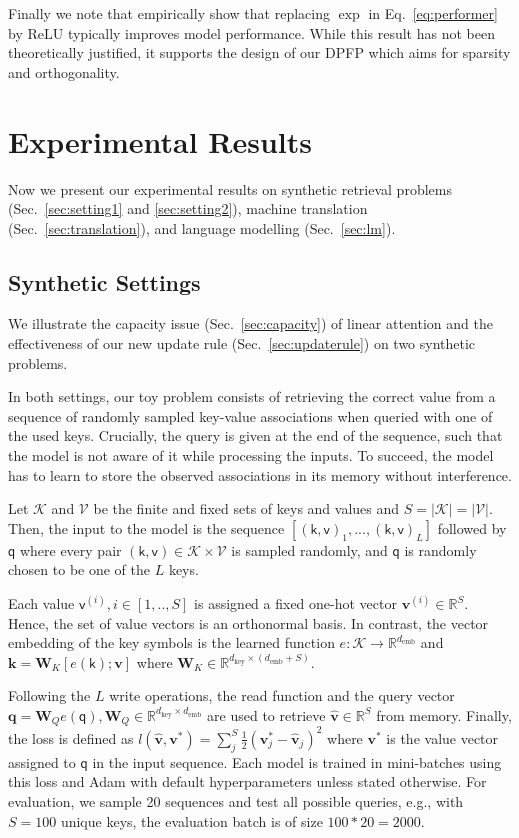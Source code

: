 \documentclass{article}
\def\vk{{\bm{k}}}
\def\vq{{\bm{q}}}
\def\vv{{\bm{v}}}
\def\mW{{\bm{W}}}
\newcommand{\ReLU}{\mathrm{ReLU}}
\theoremstyle{definition}
\begin{document}
Finally we note that \citet{choromanski2020rethinking} empirically show that replacing $\exp$
in Eq.~\ref{eq:performer} by $\ReLU$ typically improves model performance.
While this result has not been theoretically justified, it supports the
design of our DPFP which aims for sparsity and orthogonality.

\section{Experimental Results}
Now we present our experimental results on
synthetic retrieval problems (Sec.~\ref{sec:setting1} and \ref{sec:setting2}),
 machine translation (Sec.~\ref{sec:translation}), and language modelling (Sec.~\ref{sec:lm}).
\subsection{Synthetic Settings}
\label{sec:synthetic}
We illustrate the capacity issue (Sec.~\ref{sec:capacity}) of 
linear attention and the effectiveness of our new update rule (Sec.~\ref{sec:updaterule}) on two synthetic problems.

In both settings, our toy problem consists of retrieving the correct value from a sequence of randomly sampled key-value associations when queried with one of the used keys.
Crucially, the query is given at the end of the sequence, such that the model is not aware of it
while processing the inputs.
To succeed, the model has to learn to store the observed associations in its memory without interference. 

Let $\mathcal{K}$ and $\mathcal{V}$ be the finite and fixed sets of keys and values and $S=|\mathcal{K}|=|\mathcal{V}|$. 
Then, the input to the model is the sequence 
$[(\mathsf{k},\mathsf{v})_1, ..., (\mathsf{k},\mathsf{v})_L]$ 
followed by $\mathsf{q}$ 
where every pair $(\mathsf{k},\mathsf{v}) \in \mathcal{K} \times \mathcal{V}$ is sampled randomly,
and $\mathsf{q}$ is randomly chosen to be one of the $L$ keys.

Each value $\mathsf{v}^{(i)}, i \in [1,..,S]$ is assigned a fixed one-hot vector $\vv^{(i)} \in \mathbb{R}^S$. Hence, the set of value vectors is an orthonormal basis.
In contrast, the vector embedding of the key symbols is the learned function $e: \mathcal{K} \rightarrow \mathbb{R}^{d_\text{emb}}$
and $\vk = \mW_K [e(\mathsf{k});\vv]$ 
where $\mW_K \in \mathbb{R}^{d_\text{key} \times (d_\text{emb} + S)}$.

Following the $L$ write operations, the read function and the query vector 
$\vq = \mW_Q e(\mathsf{q}), \mW_Q \in \mathbb{R}^{d_\text{key} \times d_\text{emb}}$ 
are used to retrieve $\hat{\vv} \in \mathbb{R}^S$ from memory.
Finally, the loss is defined as 
$l(\hat{\vv},\vv^*) = \sum_j^S \frac{1}{2}(\vv^*_j - \hat{\vv}_j)^2$ 
where $\vv^*$ is the value vector assigned to $\mathsf{q}$ in the input sequence. 
Each model is trained in mini-batches using this loss and Adam with default hyperparameters unless stated otherwise.
For evaluation, we sample 20 sequences and test all possible queries,
e.g., with $S=100$ unique keys, the evaluation batch is of size $100*20=2000$.
\end{document}
